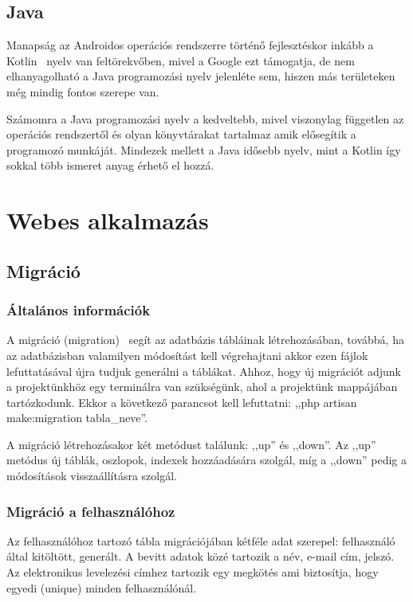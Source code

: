 \documentclass[
]{thesis-ekf}
\theoremstyle{definition}
\theoremstyle{remark}
\begin{document}
\section{Java}
Manapság az Androidos operációs rendszerre történő fejlesztéskor inkább a Kotlin~\cite{kotlin_book} nyelv van feltörekvőben, mivel a Google ezt támogatja, de nem elhanyagolható a Java programozási nyelv jelenléte sem, hiszen más területeken még mindig fontos szerepe van. 

Számomra a Java programozási nyelv a kedveltebb, mivel viszonylag független az operációs rendszertől és olyan könyvtárakat tartalmaz amik elősegítik a programozó munkáját. Mindezek mellett a Java idősebb nyelv, mint a Kotlin így sokkal több ismeret anyag érhető el hozzá.

\chapter{Webes alkalmazás}
\section{Migráció}
\subsection{Általános információk}
A migráció (migration)~\cite{laravel_migartion} segít az adatbázis tábláinak létrehozásában, továbbá, ha az adatbázisban valamilyen módosítást kell végrehajtani akkor ezen fájlok lefuttatásával újra tudjuk generálni a táblákat. Ahhoz, hogy új migrációt adjunk a projektünkhöz egy terminálra van szükségünk, ahol a projektünk mappájában tartózkodunk. Ekkor a következő parancsot kell lefuttatni: ,,php artisan make:migration tabla\_neve''.

A migráció létrehozásakor két metódust találunk: ,,up'' és ,,down''. Az ,,up'' metódus új táblák, oszlopok, indexek hozzáadására szolgál, míg a ,,down'' pedig a módosítások visszaállításra szolgál. 

\subsection{Migráció a felhasználóhoz}
Az felhasználóhoz tartozó tábla migrációjában kétféle adat szerepel: felhasználó által kitöltött, generált. A bevitt adatok közé tartozik a név, e-mail cím, jelszó. Az elektronikus levelezési címhez tartozik egy megkötés ami biztosítja, hogy egyedi (unique) minden felhasználónál. 
\end{document}
